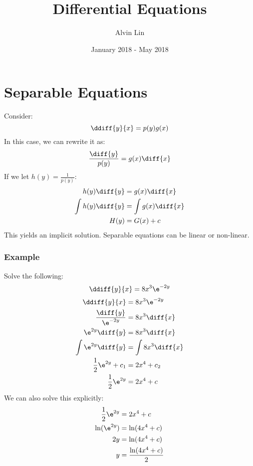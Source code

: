 \documentclass{math}
\title{Differential Equations}
\author{Alvin Lin}
\date{January 2018 - May 2018}
\begin{document}
\maketitle

\section*{Separable Equations}
Consider:
\[ \ddiff{y}{x} = p(y)g(x) \]
In this case, we can rewrite it as:
\[ \frac{\diff{y}}{p(y)} = g(x)\diff{x} \]
If we let \( h(y) = \frac{1}{p(y)} \):
\begin{align*}
  h(y)\diff{y} &= g(x)\diff{x} \\
  \int h(y)\diff{y} &= \int g(x)\diff{x} \\
  H(y) &= G(x)+c
\end{align*}
This yields an implicit solution. Separable equations can be linear or
non-linear.

\subsubsection*{Example}
Solve the following:
\[ \ddiff{y}{x} = 8x^3\e^{-2y} \]
\begin{align*}
  \ddiff{y}{x} &= 8x^3\e^{-2y} \\
  \frac{\diff{y}}{\e^{-2y}} &= 8x^3\diff{x} \\
  \e^{2y}\diff{y} &= 8x^3\diff{x} \\
  \int\e^{2y}\diff{y} &= \int 8x^3\diff{x} \\
  \frac{1}{2}\e^{2y}+c_1 &= 2x^4+c_2 \\
  \frac{1}{2}\e^{2y} &= 2x^4+c
\end{align*}
We can also solve this explicitly:
\begin{align*}
  \frac{1}{2}\e^{2y} &= 2x^4+c \\
  \ln(\e^{2y}) &= \ln(4x^4+c) \\
  2y &= \ln(4x^4+c) \\
  y &= \frac{\ln(4x^4+c)}{2}
\end{align*}
\end{document}
